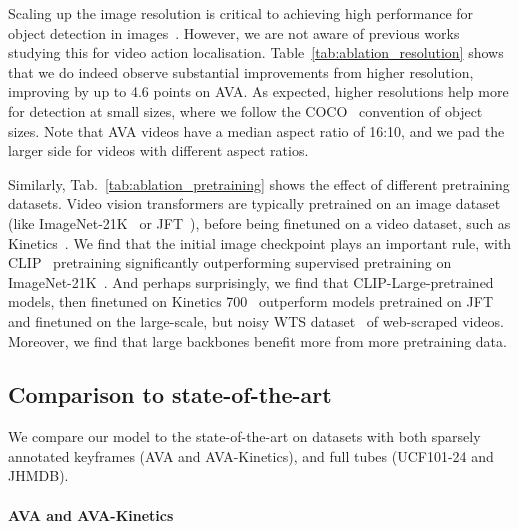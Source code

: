 \documentclass[10pt,twocolumn,letterpaper]{article}
\def \paravspace {-0.7\baselineskip}
\begin{document}
Scaling up the image resolution is critical to achieving high performance for object detection in images~\cite{huang2017speed, singh2018analysis}.
However, we are not aware of previous works studying this for video action localisation.
Table~\ref{tab:ablation_resolution} shows that we do indeed observe substantial improvements from higher resolution, improving by up to 4.6 points on AVA.
As expected, higher resolutions help more for detection at small sizes, where we follow the COCO~\cite{lin_coco_eccv_2014} convention of object sizes.
Note that AVA videos have a median aspect ratio of 16:10, and we pad the larger side for videos with different aspect ratios.

Similarly, Tab.~\ref{tab:ablation_pretraining} shows the effect of different pretraining datasets.
Video vision transformers are typically pretrained on an image dataset (like ImageNet-21K~\cite{deng_cvpr_2009} or JFT~\cite{sun_iccv_2017}), before being finetuned on a video dataset, such as Kinetics~\cite{kay_arxiv_2017}.
We find that the initial image checkpoint plays an important rule, with CLIP~\cite{radford2021learning} pretraining significantly outperforming supervised pretraining on ImageNet-21K~\cite{dosovitskiy_iclr_2021,steiner2022train}.
And perhaps surprisingly, we find that CLIP-Large-pretrained models, then finetuned on Kinetics 700~\cite{carreira2019short} outperform models pretrained on JFT~\cite{sun_iccv_2017} and finetuned on the large-scale, but noisy WTS dataset~\cite{stroud2020learning} of web-scraped videos.
Moreover, we find that large backbones benefit more from more pretraining data.




\subsection{Comparison to state-of-the-art}

We compare our model to the state-of-the-art on datasets with both sparsely annotated keyframes (AVA and AVA-Kinetics), and full tubes (UCF101-24 and JHMDB).

\vspace{\paravspace}
\paragraph{AVA and AVA-Kinetics}
\end{document}
